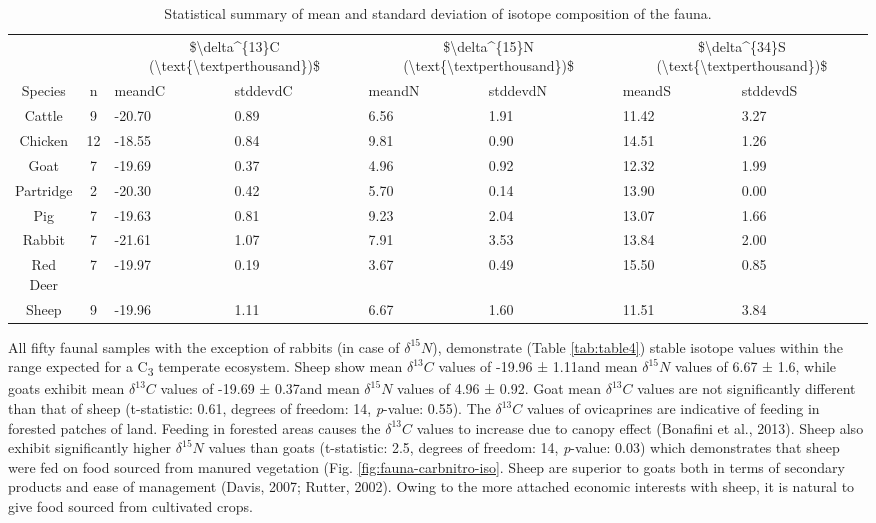 \documentclass[5p]{elsarticle} %
\begin{document}
\begin{table}

\caption{\label{tab:table5}Statistical summary of mean and standard deviation of isotope composition of the fauna.}
\centering
\begin{tabular}[t]{ccllllll}
\toprule
\multicolumn{2}{c}{ } & \multicolumn{2}{c}{\$\textbackslash{}delta\textasciicircum{}\{13\}C (\textbackslash{}text\{\textbackslash{}textperthousand\})\$} & \multicolumn{2}{c}{\$\textbackslash{}delta\textasciicircum{}\{15\}N (\textbackslash{}text\{\textbackslash{}textperthousand\})\$} & \multicolumn{2}{c}{\$\textbackslash{}delta\textasciicircum{}\{34\}S (\textbackslash{}text\{\textbackslash{}textperthousand\})\$} \\
\cmidrule(l{3pt}r{3pt}){3-4} \cmidrule(l{3pt}r{3pt}){5-6} \cmidrule(l{3pt}r{3pt}){7-8}
Species & n & meandC & stddevdC & meandN & stddevdN & meandS & stddevdS\\
\midrule
Cattle & 9 & -20.70 & 0.89 & 6.56 & 1.91 & 11.42 & 3.27\\
Chicken & 12 & -18.55 & 0.84 & 9.81 & 0.90 & 14.51 & 1.26\\
Goat & 7 & -19.69 & 0.37 & 4.96 & 0.92 & 12.32 & 1.99\\
Partridge & 2 & -20.30 & 0.42 & 5.70 & 0.14 & 13.90 & 0.00\\
Pig & 7 & -19.63 & 0.81 & 9.23 & 2.04 & 13.07 & 1.66\\
Rabbit & 7 & -21.61 & 1.07 & 7.91 & 3.53 & 13.84 & 2.00\\
Red Deer & 7 & -19.97 & 0.19 & 3.67 & 0.49 & 15.50 & 0.85\\
Sheep & 9 & -19.96 & 1.11 & 6.67 & 1.60 & 11.51 & 3.84\\
\bottomrule
\end{tabular}
\end{table}

All fifty faunal samples with the exception of rabbits (in case of \(\delta ^{15}N\)), demonstrate (Table \ref{tab:table4}) stable isotope values within the range expected for a C\textsubscript{3} temperate ecosystem.
Sheep show mean \(\delta ^{13}C\) values of -19.96 ± 1.11\permil and mean \(\delta ^{15}N\) values of 6.67 ± 1.6\permil, while goats exhibit mean \(\delta ^{13}C\) values of -19.69 ± 0.37\permil and mean \(\delta ^{15}N\) values of 4.96 ± 0.92\permil. Goat mean \(\delta ^{13}C\) values are not significantly different than that of sheep (t-statistic: 0.61, degrees of freedom: 14, \emph{p}-value: 0.55). The \(\delta ^{13}C\) values of ovicaprines are indicative of feeding in forested patches of land. Feeding in forested areas causes the \(\delta ^{13}C\) values to increase due to canopy effect (Bonafini et al., 2013). Sheep also exhibit significantly higher \(\delta ^{15}N\) values than goats (t-statistic: 2.5, degrees of freedom: 14, \emph{p}-value: 0.03) which demonstrates that sheep were fed on food sourced from manured vegetation (Fig. \ref{fig:fauna-carbnitro-iso}. Sheep are superior to goats both in terms of secondary products and ease of management (Davis, 2007; Rutter, 2002). Owing to the more attached economic interests with sheep, it is natural to give food sourced from cultivated crops.
\end{document}

